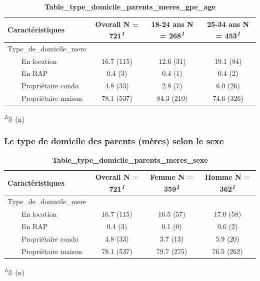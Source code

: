 \documentclass[
]{article}
\begin{document}
\newpage
\begin{table}[!t]
\caption{\label{tab:unnamed-chunk-35}\textbf{Table\_type\_domicile\_parents\_meres\_gpe\_age}} 
\fontsize{12.0pt}{14.4pt}\selectfont
\begin{tabular*}{\linewidth}{@{\extracolsep{\fill}}lccc}
\toprule
\textbf{Caractéristiques} & \textbf{Overall}  N = 721\textsuperscript{\textit{1}} & \textbf{18-24 ans}  N = 268\textsuperscript{\textit{1}} & \textbf{25-34 ans}  N = 453\textsuperscript{\textit{1}} \\ 
\midrule\addlinespace[2.5pt]
Type\_de\_domicile\_mere &  &  &  \\ 
    En location & 16.7 (115) & 12.6 (31) & 19.1 (84) \\ 
    En RAP & 0.4 (3) & 0.4 (1) & 0.4 (2) \\ 
    Propriétaire condo & 4.8 (33) & 2.8 (7) & 6.0 (26) \\ 
    Propriétaire maison & 78.1 (537) & 84.3 (210) & 74.6 (326) \\ 
\bottomrule
\end{tabular*}
\begin{minipage}{\linewidth}
\textsuperscript{\textit{1}}\% (n)\\
\end{minipage}
\end{table}
\vspace{2cm}

\hypertarget{le-type-de-domicile-des-parents-muxe8res-selon-le-sexe}{%
\subsubsection{Le type de domicile des parents (mères) selon le
sexe}\label{le-type-de-domicile-des-parents-muxe8res-selon-le-sexe}}

\newpage
\begin{table}[!t]
\caption{\label{tab:unnamed-chunk-36}\textbf{Table\_type\_domicile\_parents\_meres\_sexe}} 
\fontsize{12.0pt}{14.4pt}\selectfont
\begin{tabular*}{\linewidth}{@{\extracolsep{\fill}}lccc}
\toprule
\textbf{Caractéristiques} & \textbf{Overall}  N = 721\textsuperscript{\textit{1}} & \textbf{Femme}  N = 359\textsuperscript{\textit{1}} & \textbf{Homme}  N = 362\textsuperscript{\textit{1}} \\ 
\midrule\addlinespace[2.5pt]
Type\_de\_domicile\_mere &  &  &  \\ 
    En location & 16.7 (115) & 16.5 (57) & 17.0 (58) \\ 
    En RAP & 0.4 (3) & 0.1 (0) & 0.6 (2) \\ 
    Propriétaire condo & 4.8 (33) & 3.7 (13) & 5.9 (20) \\ 
    Propriétaire maison & 78.1 (537) & 79.7 (275) & 76.5 (262) \\ 
\bottomrule
\end{tabular*}
\begin{minipage}{\linewidth}
\textsuperscript{\textit{1}}\% (n)\\
\end{minipage}
\end{table}
\vspace{2cm}
\end{document}
